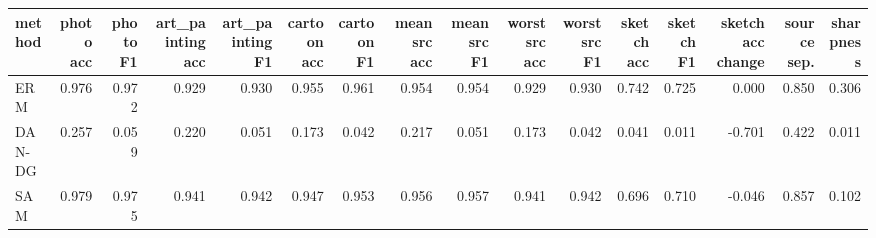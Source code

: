 \begin{tabular}{lrrrrrrrrrrrrrrr}
\toprule
method & photo acc & photo F1 & art\_painting acc & art\_painting F1 & cartoon acc & cartoon F1 & mean src acc & mean src F1 & worst src acc & worst src F1 & sketch acc & sketch F1 & sketch acc change & source sep. & sharpness \\
\midrule
ERM & 0.976 & 0.972 & 0.929 & 0.930 & 0.955 & 0.961 & 0.954 & 0.954 & 0.929 & 0.930 & 0.742 & 0.725 & 0.000 & 0.850 & 0.306 \\
DAN-DG & 0.257 & 0.059 & 0.220 & 0.051 & 0.173 & 0.042 & 0.217 & 0.051 & 0.173 & 0.042 & 0.041 & 0.011 & -0.701 & 0.422 & 0.011 \\
SAM & 0.979 & 0.975 & 0.941 & 0.942 & 0.947 & 0.953 & 0.956 & 0.957 & 0.941 & 0.942 & 0.696 & 0.710 & -0.046 & 0.857 & 0.102 \\
\bottomrule
\end{tabular}
